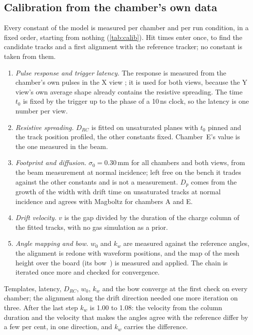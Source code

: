 \subsection{Calibration from the chamber's own data}\label{sec:calibration}
Every constant of the model is measured per chamber and per run condition, in a fixed order, starting from nothing
(\cref{tab:calib}). Hit times enter once, to find the candidate tracks and a first alignment with the reference
tracker; no constant is taken from them.
\begin{enumerate}
  \item \emph{Pulse response and trigger latency.} The response is measured from the chamber's own pulses in the X
  view ; it is used for both views, because the Y
  view's own average shape already contains the resistive spreading. The time $t_0$ is fixed by the trigger up to the phase of a 10\,ns clock, so the
  latency is one number per view.
  \item \emph{Resistive spreading.} $D_{RC}$ is fitted on unsaturated planes with $t_0$ pinned and the track position
  profiled, the other constants fixed. Chamber~E's value is the one measured in the beam.
  \item \emph{Footprint and diffusion.} $\sigma_0 = 0.30$\,mm for all chambers and both views, from the beam
  measurement at normal incidence; left free on the bench it trades against the other constants and is not a
  measurement. $D_p$ comes from the growth of the width with drift time on unsaturated tracks at normal
  incidence and agrees with Magboltz for chambers A and E.
  \item \emph{Drift velocity.} $v$ is the gap divided by the duration of the charge column of the fitted tracks, with
  no gas simulation as a prior.
  \item \emph{Angle mapping and bow.} $w_0$ and $k_w$ are measured against the reference angles, the alignment is
  redone with waveform positions, and the map of the mesh height over the board (its bow~\cite{paperI}) is measured
  and applied. The chain is iterated once more and checked for convergence.
\end{enumerate}
Templates, latency, $D_{RC}$, $w_0$, $k_w$ and the bow converge at the first check on every chamber; the alignment along the
drift direction needed one more iteration on three. After the last step $k_w$ is 1.00 to 1.08: the velocity from
the column duration and the velocity that makes the angles agree with the reference differ by a few per cent, in one
direction, and $k_w$ carries the difference. 

